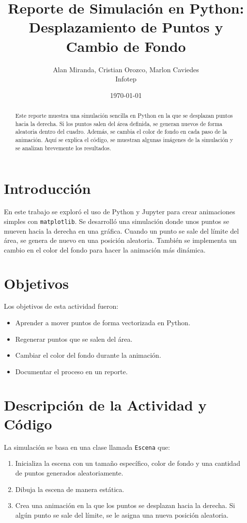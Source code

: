 \documentclass[a4paper,10pt]{article}
\title{Reporte de Simulación en Python: Desplazamiento de Puntos y Cambio de Fondo}
\author{Alan Miranda, Cristian Orozco, Marlon Caviedes \\ \small{Infotep}}
\date{\today}
\begin{document}
\maketitle

\begin{abstract}
Este reporte muestra una simulación sencilla en Python en la que se desplazan puntos hacia la derecha. Si los puntos salen del área definida, se generan nuevos de forma aleatoria dentro del cuadro. Además, se cambia el color de fondo en cada paso de la animación. Aquí se explica el código, se muestran algunas imágenes de la simulación y se analizan brevemente los resultados.
\end{abstract}

\section{Introducción}
En este trabajo se exploró el uso de Python y Jupyter para crear animaciones simples con \texttt{matplotlib}. Se desarrolló una simulación donde unos puntos se mueven hacia la derecha en una gráfica. Cuando un punto se sale del límite del área, se genera de nuevo en una posición aleatoria. También se implementa un cambio en el color del fondo para hacer la animación más dinámica.

\section{Objetivos}
Los objetivos de esta actividad fueron:
\begin{itemize}
    \item Aprender a mover puntos de forma vectorizada en Python.
    \item Regenerar puntos que se salen del área.
    \item Cambiar el color del fondo durante la animación.
    \item Documentar el proceso en un reporte.
\end{itemize}

\section{Descripción de la Actividad y Código}
La simulación se basa en una clase llamada \texttt{Escena} que:
\begin{enumerate}
    \item Inicializa la escena con un tamaño específico, color de fondo y una cantidad de puntos generados aleatoriamente.
    \item Dibuja la escena de manera estática.
    \item Crea una animación en la que los puntos se desplazan hacia la derecha. Si algún punto se sale del límite, se le asigna una nueva posición aleatoria.
\end{enumerate}
\end{document}
